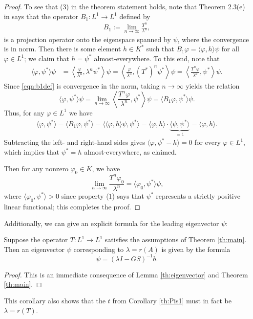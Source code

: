 \begin{proof}
	To see that (3) in the theorem statement holds, note that Theorem 2.3(e) in \cite{Marek1970} says that the operator $B_1:L^1 \to L^1$ defined by
	\begin{align}
		B_1 := \lim_{n \to \infty} \frac{T^n}{\lambda^n}, \label{eqn:b1def}
	\end{align}
	is a projection operator onto the eigenspace spanned by $\psi$, where the convergence is in norm. Then there is some element $h \in K^*$ such that $B_1 \varphi = \langle \varphi, h \rangle \psi$ for all $\varphi \in L^1$; we claim that $h = \psi^*$ almost-everywhere. To this end, note that
	\begin{align*}
		\langle \varphi, \psi^* \rangle \psi &= \left \langle \frac{\varphi}{\lambda^n}, \lambda^n \psi^* \right \rangle \psi = \left \langle \frac{\varphi}{\lambda^n}, (T^*)^n \psi^* \right \rangle \psi = \left \langle \frac{T^n \varphi}{\lambda^n}, \psi^* \right \rangle \psi.
	\end{align*}
	Since \eqref{eqn:b1def} is convergence in the norm, taking $n \to \infty$ yields the relation
	\[\langle \varphi, \psi^* \rangle \psi = \lim_{n \to \infty} \left \langle \frac{T^n \varphi}{\lambda^n}, \psi^* \right \rangle \psi = \langle B_1 \varphi, \psi^* \rangle \psi.\]
	Thus, for any $\varphi \in L^1$ we have
	\begin{align*}
		\langle \varphi, \psi^* \rangle = \langle B_1 \varphi, \psi^* \rangle = \langle \langle \varphi, h \rangle \psi, \psi^* \rangle = \langle \varphi, h \rangle \cdot \underbrace{\langle \psi, \psi^* \rangle}_{=1} = \langle \varphi, h \rangle.
	\end{align*}
	Subtracting the left- and right-hand sides gives $\langle \varphi, \psi^* - h \rangle = 0$ for every $\varphi \in L^1$, which implies that $\psi^* = h$ almost-everywhere, as claimed.
	
	Then for any nonzero $\varphi_0 \in K$, we have
	\[\lim_{n \to \infty} \frac{T^n \varphi_0}{\lambda^n} = \langle \varphi_0, \psi^* \rangle \psi,\]
	where $\langle \varphi_0, \psi^* \rangle > 0$ since property (1) says that $\psi^*$ represents a strictly positive linear functional; this completes the proof. 
	
\end{proof}

Additionally, we can give an explicit formula for the leading eigenvector $\psi$:

\begin{corollary} \label{th:existenceofevector}
	Suppose the operator $T:L^1 \to L^1$ satisfies the assumptions of Theorem \ref{th:main}. Then an eigenvector $\psi$ corresponding to $\lambda = r(A)$ is given by the formula
	\[\psi = (\lambda I - GS)^{-1}b.\]
\end{corollary}

\begin{proof}
	This is an immediate consequence of Lemma \ref{th:eigenvector} and Theorem \ref{th:main}.
\end{proof}

This corollary also shows that the $t$ from Corollary \ref{th:Pis1} must in fact be $\lambda = r(T)$.